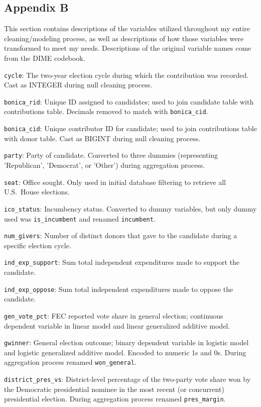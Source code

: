 \subsection*{Appendix B}

This section contains descriptions of the variables utilized throughout my entire cleaning/modeling process, as well as descriptions of how those variables were transformed to meet my needs. Descriptions of the original variable names come from the DIME codebook.

\texttt{cycle}: The two-year election cycle during which the contribution was recorded. Cast as INTEGER during null cleaning process.

\texttt{bonica\_rid}: Unique ID assigned to candidates; used to join candidate table with contributions table. Decimals removed to match with \texttt{bonica\_cid}.

\texttt{bonica\_cid}: Unique contributor ID for candidate; used to join contributions table with donor table. Cast as BIGINT during null cleaning process.

\texttt{party}: Party of candidate. Converted to three dummies (representing 'Republican', 'Democrat', or 'Other') during aggregation process.

\texttt{seat}: Office sought. Only used in initial database filtering to retrieve all U.S.\ House elections.

\texttt{ico\_status}: Incumbency status. Converted to dummy variables, but only dummy used was \texttt{is\_incumbent} and renamed \texttt{incumbent}.

\texttt{num\_givers}: Number of distinct donors that gave to the candidate during a specific election cycle.

\texttt{ind\_exp\_support}: Sum total independent expenditures made to support the candidate.

\texttt{ind\_exp\_oppose}: Sum total independent expenditures made to oppose the candidate.

\texttt{gen\_vote\_pct}: FEC reported vote share in general election; continuous dependent variable in linear model and linear generalized additive model.

\texttt{gwinner}: General election outcome; binary dependent variable in logistic model and logistic generalized additive model. Encoded to numeric 1s and 0s. During aggregation process renamed \texttt{won\_general}.

\texttt{district\_pres\_vs}: District-level percentage of the two-party vote share won by the Democratic presidential nominee in the most recent (or concurrent) presidential election. During aggregation process renamed \texttt{pres\_margin}.

